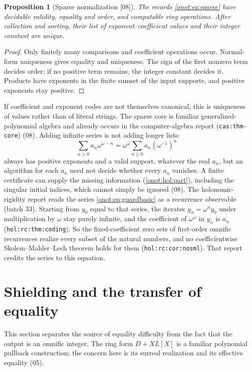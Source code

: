 \documentclass[11pt,oneside]{article}
\numberwithin{equation}{section}
\newtheorem{proposition}[proposition]{Proposition}
\theoremstyle{definition}
\theoremstyle{remark}
\newcommand{\src}[1]{\textup{\textsf{\small[#1]}}}
\newcommand{\replabel}[1]{\nolinkurl{#1}}
\begin{document}
\begin{proposition}[Sparse normalization \src{08}]\label{onot:prop:sparse}
The records \eqref{onot:eq:sparse} have decidable validity, equality and order,
and computable ring operations. After collection and sorting, their list of
exponent--coefficient values and their integer constant are unique.
\end{proposition}
\begin{proof}
Only finitely many comparisons and coefficient operations occur. Normal-form
uniqueness gives equality and uniqueness. The sign of the first nonzero term
decides order; if no positive term remains, the integer constant decides it.
Products have exponents in the finite sumset of the input supports, and
positive exponents stay positive.
\end{proof}
If coefficient and exponent codes are not themselves canonical, this is
uniqueness of values rather than of literal strings. The sparse core is
familiar generalized-polynomial algebra and already occurs in the
computer-algebra report (\replabel{cas:thm-core}) (08). Adding infinite series is
not adding longer lists:
\begin{equation}\label{onot:eq:guardbasic}
 \sum_{n\ge0}a_n\omega^{\omega-n}=\omega^\omega\sum_{n\ge0}a_n(\omega^{-1})^n
\end{equation}
always has positive exponents and a valid support, whatever the real $a_n$, but
an algorithm for each $a_n$ need not decide whether every $a_n$ vanishes. A
finite certificate can supply the missing information (\cref{onot:hol:part}),
including the singular initial indices, which cannot simply be ignored (08).
The holonomic-rigidity report reads the series \eqref{onot:eq:guardbasic} as a
recurrence observable (batch 33). Starting from $y_0$ equal to that series,
the iterates $y_n=\omega^n y_0$ under multiplication by $\omega$ stay purely
infinite, and the coefficient of
$\omega^\omega$ in $y_n$ is $a_n$ (\replabel{hol:rc:thm:coding}). So the
fixed-coefficient zero sets of first-order omnific recurrences realize every
subset of the natural numbers, and no coefficientwise
Skolem--Mahler--Lech theorem holds for them (\replabel{hol:rc:cor:nosml}).
That report credits the series to this equation.

\section{Shielding and the transfer of equality}\label{onot:sec:shield}

This section separates the source of equality difficulty from the fact that the
output is an omnific integer. The ring form $D+XL[X]$ is a familiar polynomial
pullback construction; the concern here is its surreal realization and its
effective equality (05).
\end{document}
